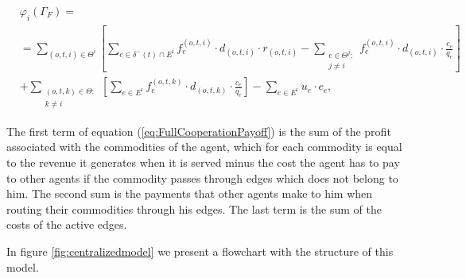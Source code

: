 \documentclass[authoryear]{elsarticle}
\begin{document}
\begin{enumerate}[(a)]
\begin{equation}
    \begin{split}
    & \varphi_i(\Gamma_F) =\label{eq:FullCooperationPayoff} \\
    & = \sum_{(o,t,i)\in \Theta^i} \left[ \sum_{e \in \delta^-(t)\cap E^i} f_e^{(o,t,i)} \cdot d_{(o,t,i)} \cdot r_{(o,t,i)} -  \sum_{\substack{e\in \Theta^j \colon\\ j\not = i}} f_e^{(o,t,i)} \cdot d_{(o,t,i)} \cdot \frac{c_e}{q_e} \right]  \\
    & + \sum_{\substack{(o,t,k) \in \Theta  \colon \\ k \not = i}} \left[\sum_{e \in E^i} f_e^{(o,t,k)} \cdot d_{(o,t,k)} \cdot \frac{c_e}{q_e}\right] - \sum_{e \in E^i} u_e \cdot c_e, 
    \end{split}
\end{equation}

\end{enumerate}


The first term of equation (\ref{eq:FullCooperationPayoff}) is the sum of the profit associated with the commodities of the agent, which for each commodity is equal to the revenue it
generates when it is served minus the cost the agent has to pay to other agents if the commodity passes through edges which does not belong to him. The second sum is the payments that other agents make to him when routing their commodities through his edges. The last term is the sum of the costs of the active edges.

In figure \ref{fig:centralizedmodel} we present a flowchart with the structure of this model.
\end{document}
